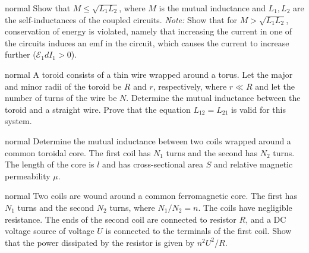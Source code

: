 \hypertarget{P146}{}
\begin{solution}{normal} %
Show that $M\leq\sqrt{L_1L_2}$, where $M$ is the mutual inductance and $L_1,L_2$ are the self-inductances of the coupled circuits. \textit{Note:} Show that for $M>\sqrt{L_1L_2}$, conservation of energy is violated, namely that increasing the current in one of the circuits induces an emf in the circuit, which causes the current to increase further ($\mathcal{E}_1dI_1>0$).
\end{solution}

\hypertarget{P147}{}
\begin{solution}{normal} %
A toroid consists of a thin wire wrapped around a torus. Let the major and minor radii of the toroid be $R$ and $r$, respectively, where $r\ll R$ and let the number of turns of the wire be $N$. Determine the mutual inductance between the toroid and a straight wire. Prove that the equation $L_{12}=L_{21}$ is valid for this system.
\end{solution}

\hypertarget{P148}{}
\begin{solution}{normal} %
Determine the mutual inductance between two coils wrapped around a common toroidal core. The first coil has $N_1$ turns and the second has $N_2$ turns. The length of the core is $l$ and has cross-sectional area $S$ and relative magnetic permeability $\mu$.
\end{solution}

\hypertarget{P149}{}
\begin{solution}{normal} %
Two coils are wound around a common ferromagnetic core. The first has $N_1$ turns and the second $N_2$ turns, where $N_1/N_2=n$. The coils have negligible resistance. The ends of the second coil are connected to resistor $R$, and a DC voltage source of voltage $U$ is connected to the terminals of the first coil. Show that the power dissipated by the resistor is given by $n^2U^2/R$.
\end{solution}

